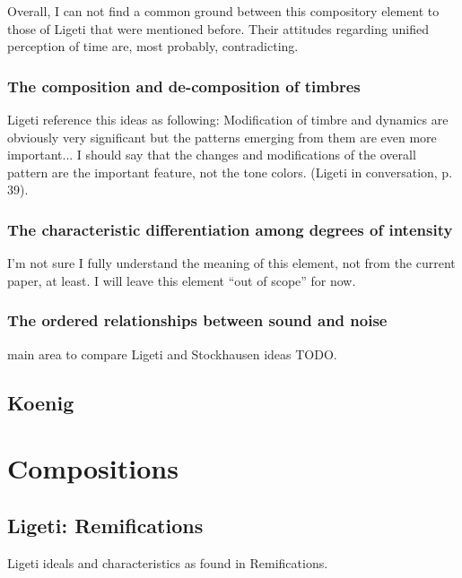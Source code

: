 \documentclass[a4paper,11pt]{article}
\begin{document}
Overall, I can not find a common ground between this compository element to those of Ligeti that were mentioned before.
Their attitudes regarding unified perception of time are, most probably, contradicting.

\subsubsection{The composition and de-composition of timbres}
\label{subs:stockhausen:timber}

Ligeti reference this ideas as following:
Modification of timbre and dynamics are obviously very significant but the patterns emerging from them are even more important...
I should say that the changes and modifications of the overall pattern are the important feature, not the tone colors. (Ligeti in conversation, p. 39).

\subsubsection{The characteristic differentiation among degrees of intensity}
\label{subs:stockhausen:intensity}

I'm not sure I fully understand the meaning of this element, not from the current paper, at least.
I will leave this element ``out of scope'' for now.

\subsubsection{The ordered relationships between sound and noise}
\label{subs:stockhausen:noise}

main area to compare Ligeti and Stockhausen ideas TODO.

\subsection{Koenig}
\label{sub:eshtetic_koenig}

\section{Compositions}
\label{sec:compositions}

\subsection{Ligeti: Remifications}
\label{sub:composition_ligeti}

Ligeti ideals and characteristics as found in Remifications.
\end{document}
